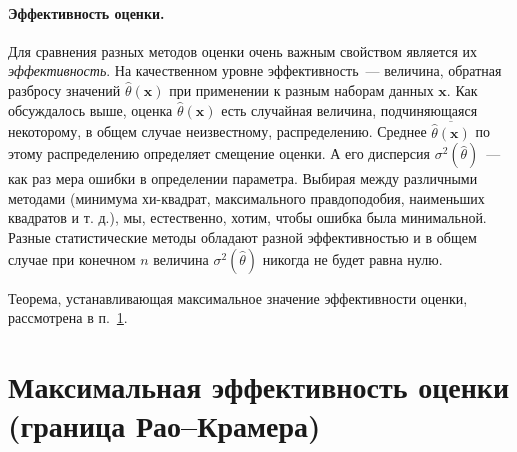 

\paragraph{Эффективность оценки.}
Для сравнения разных методов оценки очень важным свойством является
их \emph{эффективность}. На качественном уровне эффективность~--- величина,
обратная разбросу значений $\hat{\theta}(\mathbf{x})$ при применении к разным
наборам данных $\mathbf{x}$. Как обсуждалось выше, оценка $\hat{\theta}(\mathbf{x})$
есть случайная величина, подчиняющаяся некоторому, в общем случае неизвестному,
распределению. Среднее $\overline{\hat{\theta}(\mathbf{x})}$ по этому распределению
определяет смещение оценки.
А его дисперсия $\sigma^2\left(\hat\theta\right)$~--- как раз мера ошибки
в определении параметра. Выбирая между различными методами (минимума хи-квадрат, максимального правдоподобия, наименьших квадратов и т. д.), мы, естественно,
хотим, чтобы ошибка была минимальной. Разные статистические методы обладают
разной эффективностью и в общем случае при конечном $n$ величина
$\sigma^2\left(\hat\theta\right)$ никогда не будет равна нулю.

Теорема, устанавливающая максимальное значение эффективности оценки,
рассмотрена в п.~\ref{sec:rao}.


\section{Максимальная эффективность оценки (граница Рао--Крамера)}\label{sec:rao}

